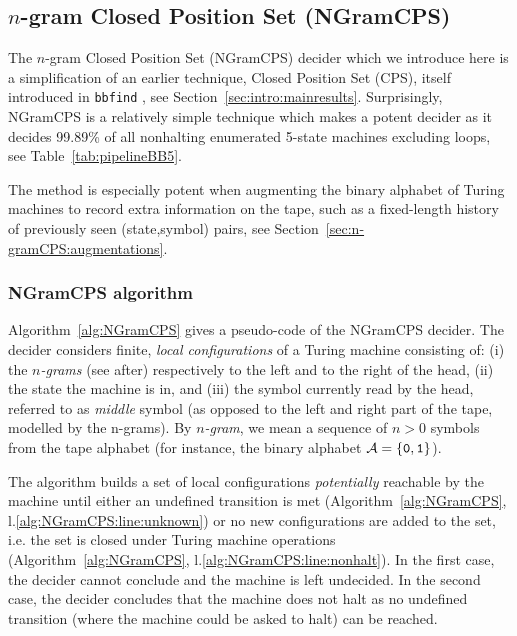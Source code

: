 
\newcommand{\ngramcps}{NGramCPS\xspace}

\subsection{$n$-gram Closed Position Set (\ngramcps)}\label{sec:n-gramCPS}

The $n$-gram Closed Position Set (\ngramcps) decider which we introduce here is a simplification of an earlier technique, Closed Position Set (CPS), itself introduced in \texttt{bbfind} \cite{Skelet_bbfind}, see Section~\ref{sec:intro:mainresults}. Surprisingly, \ngramcps is a relatively simple technique which makes a potent decider as it decides 99.89\% of all nonhalting enumerated 5-state machines excluding loops, see Table~\ref{tab:pipelineBB5}.

The method is especially potent when augmenting the binary alphabet of Turing machines to record extra information on the tape, such as a fixed-length history of previously seen (state,symbol) pairs, see Section~\ref{sec:n-gramCPS:augmentations}.

\subsubsection{\ngramcps algorithm}\label{sec:n-gramCPS:algo}

Algorithm~\ref{alg:NGramCPS} gives a pseudo-code of the \ngramcps decider. The decider considers finite, \textit{local configurations} of a Turing machine consisting of: (i) the \textit{$n$-grams} (see after) respectively to the left and to the right of the head, (ii) the state the machine is in, and (iii) the symbol currently read by the head, referred to as \textit{middle} symbol (as opposed to the left and right part of the tape, modelled by the n-grams). By \textit{$n$-gram}, we mean a sequence of $n > 0$ symbols from the tape alphabet (for instance, the binary alphabet $\mathcal{A}=\{\texttt{0},\texttt{1}\}$).

The algorithm builds a set of local configurations \textit{potentially} reachable by the machine until either an undefined transition is met (Algorithm~\ref{alg:NGramCPS}, l.\ref{alg:NGramCPS:line:unknown}) or no new configurations are added to the set, i.e. the set is closed under Turing machine operations (Algorithm~\ref{alg:NGramCPS}, l.\ref{alg:NGramCPS:line:nonhalt}). In the first case, the decider cannot conclude and the machine is left undecided. In the second case, the decider concludes that the machine does not halt as no undefined transition (\ie where the machine could be asked to halt) can be reached.

